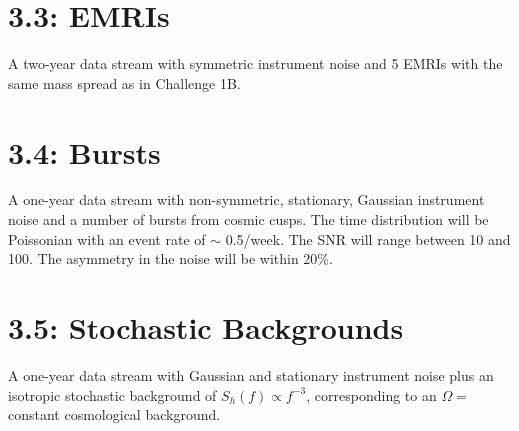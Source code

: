 \documentclass[11pt]{article}
\begin{document}
\section*{3.3: EMRIs}

A two-year data stream with symmetric instrument noise and 5 EMRIs with the same mass spread as in Challenge 1B.

\section*{3.4: Bursts}

A one-year data stream with non-symmetric, stationary, Gaussian instrument noise and a number of bursts from cosmic cusps. The time distribution will be Poissonian with an event rate of $\sim$ 0.5/week. The SNR will range between 10 and 100. The asymmetry in the noise will be within 20\%.

\section*{3.5: Stochastic Backgrounds}

A one-year data stream with Gaussian and stationary instrument noise plus an isotropic stochastic background of $S_h(f) \propto f^{-3}$, corresponding to an $\Omega =$ constant cosmological background.
\end{document}
